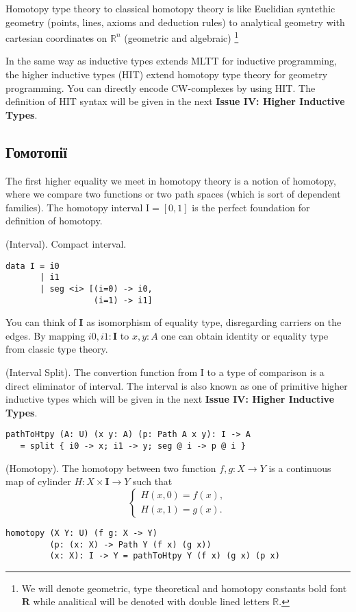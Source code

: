 Homotopy type theory to classical homotopy theory is like Euclidian
syntethic geometry (points, lines, axioms and deduction rules) to
analytical geometry with cartesian coordinates on $\mathbb{R}^n$ (geometric and algebraic)
\footnote{We will denote geometric, type theoretical and homotopy constants bold font $\textbf{R}$ while
analitical will be denoted with double lined letters $\mathbb{R}$.}

In the same way as inductive types extends MLTT for inductive programming,
the higher inductive types (HIT) extend homotopy type theory for geometry programming.
You can directly encode CW-complexes by using HIT. The definition of HIT syntax will
be given in the next \textbf{Issue IV: Higher Inductive Types}.

\subsection{Гомотопії}
The first higher equality we meet in homotopy theory is a notion of homotopy,
where we compare two functions or two path spaces (which is sort of dependent families).
The homotopy interval $\mathrm{I}=[0,1]$ is the perfect foundation for definition of homotopy.

\begin{definition} (Interval). Compact interval.
\begin{lstlisting}
data I = i0
       | i1
       | seg <i> [(i=0) -> i0,
                  (i=1) -> i1]
\end{lstlisting}
\end{definition}

You can think of $\textbf{I}$ as isomorphism of equality type,
disregarding carriers on the edges. By mapping $i0,i1:\textbf{I}$ to $x,y:A$ one can
obtain identity or equality type from classic type theory.

\begin{definition} (Interval Split).
The convertion function from $\mathrm{I}$ to a type of comparison
is a direct eliminator of interval. The interval is also known as one of
primitive higher inductive types which will be given in the next
\textbf{Issue IV: Higher Inductive Types}.
\begin{lstlisting}
pathToHtpy (A: U) (x y: A) (p: Path A x y): I -> A
   = split { i0 -> x; i1 -> y; seg @ i -> p @ i }
\end{lstlisting}
\end{definition}

\begin{definition} (Homotopy). The homotopy between two function $f,g: X \rightarrow Y$
is a continuous map of cylinder $H : X \times \textbf{I} \rightarrow Y$ such that
$$
\begin{cases}
H(x,0)=f(x), \\
H(x,1)=g(x).
\end{cases}
$$
\begin{lstlisting}
homotopy (X Y: U) (f g: X -> Y)
         (p: (x: X) -> Path Y (f x) (g x))
         (x: X): I -> Y = pathToHtpy Y (f x) (g x) (p x)
\end{lstlisting}
\end{definition}

